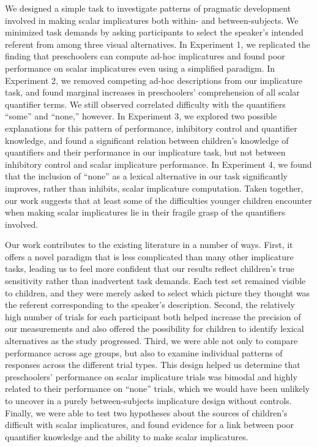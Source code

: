 \documentclass[man]{apa2}
\begin{document}
{We designed a simple task to investigate patterns of pragmatic development involved in making scalar implicatures both within- and between-subjects. We minimized task demands by asking participants to select the speaker's intended referent from among three visual alternatives. In Experiment 1, we replicated the finding that preschoolers can compute ad-hoc implicatures \cite{stiller2015} and found poor performance on scalar implicatures even using a simplified paradigm. In Experiment 2, we removed competing ad-hoc descriptions from our implicature task, and found marginal increases in preschoolers' comprehension of all scalar quantifier terms. We still observed correlated difficulty with the quantifiers ``some'' and ``none,'' however. In Experiment 3, we explored two possible explanations for this pattern of performance, inhibitory control and quantifier knowledge, and found a significant relation between children's knowledge of quantifiers and their performance in our implicature task, but not between inhibitory control and scalar implicature performance. In Experiment 4, we found that the inclusion of ``none'' as a lexical alternative in our task significantly improves, rather than inhibits, scalar implicature computation. Taken together, our work suggests that at least some of the difficulties younger children encounter when making scalar implicatures lie in their fragile grasp of the quantifiers involved.


Our work contributes to the existing literature in a number of ways. First, it offers a novel paradigm that is less complicated than many other implicature tasks, leading us to feel more confident that our results reflect children's true sensitivity rather than inadvertent task demands. Each test set remained visible to children, and they were merely asked to select which picture they thought was the referent corresponding to the speaker's description. Second, the relatively high number of trials for each participant both helped increase the precision of our measurements and also offered the possibility for children to identify lexical alternatives as the study progressed. Third, we were able not only to compare performance across age groups, but also to examine individual patterns of responses across the different trial types. This design helped us determine that preschoolers' performance on scalar implicature trials was bimodal and highly related to their performance on ``none'' trials, which we would have been unlikely to uncover in a purely between-subjects implicature design without controls. Finally, we were able to test two hypotheses about the sources of children's difficult with scalar implicatures, and found evidence for a link between poor quantifier knowledge and the ability to make scalar implicatures.

}
\end{document}
